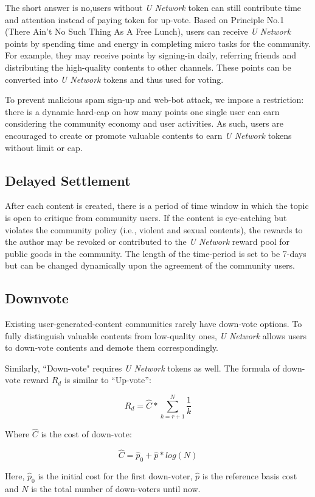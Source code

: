 The short answer is no,users without \emph{U Network}  token can still contribute time and attention instead of paying token for up-vote. Based on Principle No.1 (There Ain't No Such Thing As A Free Lunch), users can receive \emph{U Network}  points by spending time and energy in completing micro tasks for the community. For example, they may receive points by signing-in daily, referring friends and distributing the high-quality contents to other channels. These points can be converted into \emph{U Network}  tokens and thus used for voting.  

To prevent malicious spam sign-up and web-bot attack, we impose a restriction: there is a dynamic hard-cap on how many points one single user can earn considering the community economy and user activities. As such, users are encouraged to create or promote valuable contents to earn \emph{U Network} tokens without limit or cap. 

\subsection{Delayed Settlement}
After each content is created, there is a period of time window in which the topic is open to critique from community users. If the content is eye-catching but violates the community policy (i.e., violent and sexual contents), the rewards to the author may be revoked or contributed to the \emph{U Network} reward pool for public goods in the community. The length of the time-period is set to be 7-days but can be changed dynamically upon the agreement of the community users.

\subsection{Downvote}
Existing user-generated-content communities rarely have down-vote options. To fully distinguish valuable contents from low-quality ones, \emph{U Network} allows users to down-vote contents and demote them correspondingly.

Similarly, ``Down-vote" requires \emph{U Network} tokens as well. The formula of down-vote reward $R_d$ is similar to ``Up-vote'':
\begin{center}
$$R_d = \hat C * \sum_{k=r+1}^{N} \frac{1}{k}$$
\end{center}
Where $\hat C$ is the cost of down-vote:
 \begin{center}
$$\hat C = \hat p_0 + \hat p * log(N)$$
\end{center}
Here, $\hat p_0$ is the initial cost for the first down-voter, $\hat p$ is the reference basis cost and $N$ is the total number of down-voters until now. 
 
